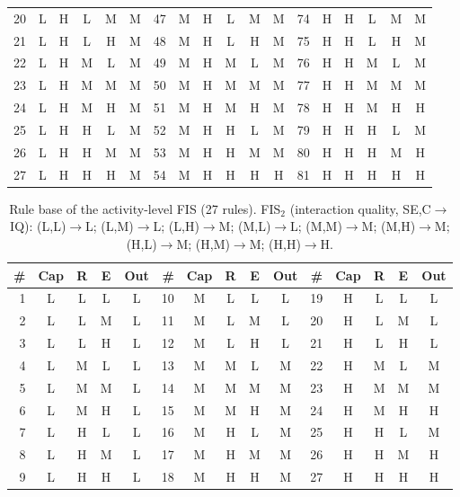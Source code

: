 \begin{table}[!htbp]
{\begin{tabular}{rccccc|rccccc|rccccc}
20 & L & H & L & M & M & 47 & M & H & L & M & M & 74 & H & H & L & M & M\\
21 & L & H & L & H & M & 48 & M & H & L & H & M & 75 & H & H & L & H & M\\
22 & L & H & M & L & M & 49 & M & H & M & L & M & 76 & H & H & M & L & M\\
23 & L & H & M & M & M & 50 & M & H & M & M & M & 77 & H & H & M & M & M\\
24 & L & H & M & H & M & 51 & M & H & M & H & M & 78 & H & H & M & H & H\\
25 & L & H & H & L & M & 52 & M & H & H & L & M & 79 & H & H & H & L & M\\
26 & L & H & H & M & M & 53 & M & H & H & M & M & 80 & H & H & H & M & H\\
27 & L & H & H & H & M & 54 & M & H & H & H & H & 81 & H & H & H & H & H\\
\bottomrule
\end{tabular}}
\end{table}

\begin{table}[!htbp]
\centering
\caption{Rule base of the activity-level FIS (27 rules). FIS$_2$ (interaction quality, SE,C$\to$IQ): (L,L)$\to$L; (L,M)$\to$L; (L,H)$\to$M; (M,L)$\to$L; (M,M)$\to$M; (M,H)$\to$M; (H,L)$\to$M; (H,M)$\to$M; (H,H)$\to$H.}
\label{tab:A-rulesAct}
\footnotesize
\begin{tabular}{rcccc|rcccc|rcccc}
\toprule
\# & Cap & R & E & Out & \# & Cap & R & E & Out & \# & Cap & R & E & Out\\
\midrule
1 & L & L & L & L & 10 & M & L & L & L & 19 & H & L & L & L\\
2 & L & L & M & L & 11 & M & L & M & L & 20 & H & L & M & L\\
3 & L & L & H & L & 12 & M & L & H & L & 21 & H & L & H & L\\
4 & L & M & L & L & 13 & M & M & L & M & 22 & H & M & L & M\\
5 & L & M & M & L & 14 & M & M & M & M & 23 & H & M & M & M\\
6 & L & M & H & L & 15 & M & M & H & M & 24 & H & M & H & H\\
7 & L & H & L & L & 16 & M & H & L & M & 25 & H & H & L & M\\
8 & L & H & M & L & 17 & M & H & M & M & 26 & H & H & M & H\\
9 & L & H & H & L & 18 & M & H & H & M & 27 & H & H & H & H\\
\bottomrule
\end{tabular}
\end{table}

